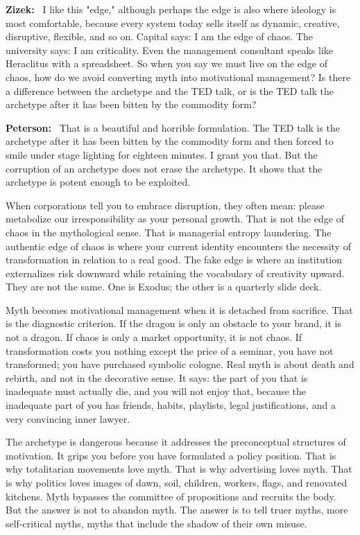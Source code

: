 \documentclass[a4paper,11pt]{article}
\newenvironment{question}{\par\noindent\color{ALIUSRed}\textbf{Zizek:}\ }{\par}
\newenvironment{answer}{\par\noindent\color{black}\textbf{Peterson:}\ }{\par}
\begin{document}
\begin{question}
I like this "edge," although perhaps the edge is also where ideology is most comfortable, because every system today sells itself as dynamic, creative, disruptive, flexible, and so on. Capital says: I am the edge of chaos. The university says: I am criticality. Even the management consultant speaks like Heraclitus with a spreadsheet. So when you say we must live on the edge of chaos, how do we avoid converting myth into motivational management? Is there a difference between the archetype and the TED talk, or is the TED talk the archetype after it has been bitten by the commodity form?
\end{question}

\begin{answer}
That is a beautiful and horrible formulation. The TED talk is the archetype after it has been bitten by the commodity form and then forced to smile under stage lighting for eighteen minutes. I grant you that. But the corruption of an archetype does not erase the archetype. It shows that the archetype is potent enough to be exploited.

When corporations tell you to embrace disruption, they often mean: please metabolize our irresponsibility as your personal growth. That is not the edge of chaos in the mythological sense. That is managerial entropy laundering. The authentic edge of chaos is where your current identity encounters the necessity of transformation in relation to a real good. The fake edge is where an institution externalizes risk downward while retaining the vocabulary of creativity upward. They are not the same. One is Exodus; the other is a quarterly slide deck.

Myth becomes motivational management when it is detached from sacrifice. That is the diagnostic criterion. If the dragon is only an obstacle to your brand, it is not a dragon. If chaos is only a market opportunity, it is not chaos. If transformation costs you nothing except the price of a seminar, you have not transformed; you have purchased symbolic cologne. Real myth is about death and rebirth, and not in the decorative sense. It says: the part of you that is inadequate must actually die, and you will not enjoy that, because the inadequate part of you has friends, habits, playlists, legal justifications, and a very convincing inner lawyer.

The archetype is dangerous because it addresses the preconceptual structures of motivation. It grips you before you have formulated a policy position. That is why totalitarian movements love myth. That is why advertising loves myth. That is why politics loves images of dawn, soil, children, workers, flags, and renovated kitchens. Myth bypasses the committee of propositions and recruits the body. But the answer is not to abandon myth. The answer is to tell truer myths, more self-critical myths, myths that include the shadow of their own misuse.


\end{answer}
\end{document}
